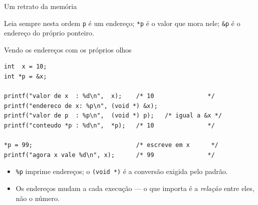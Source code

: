 \documentclass[aspectratio=169]{beamer}
\begin{document}
\begin{frame}{Um retrato da memória}
  \begin{center}
  \end{center}
  \begin{exampleblock}{Leia sempre nesta ordem}
    \texttt{p} é um endereço; \texttt{*p} é o valor que mora nele;
    \texttt{\&p} é o endereço do próprio ponteiro.
  \end{exampleblock}
\end{frame}

\begin{frame}[fragile]{Vendo os endereços com os próprios olhos}
\begin{lstlisting}
int  x = 10;
int *p = &x;

printf("valor de x  : %d\n",  x);    /* 10               */
printf("endereco de x: %p\n", (void *) &x);
printf("valor de p  : %p\n",  (void *) p);   /* igual a &x */
printf("conteudo *p : %d\n",  *p);   /* 10               */

*p = 99;                             /* escreve em x      */
printf("agora x vale %d\n", x);      /* 99               */
\end{lstlisting}
  \begin{itemize}
    \item \texttt{\%p} imprime endereços; o \texttt{(void *)} é a conversão exigida pelo padrão.
    \item Os endereços mudam a cada execução --- o que importa é a
      \emph{relação} entre eles, não o número.
  \end{itemize}
\end{frame}
\end{document}
